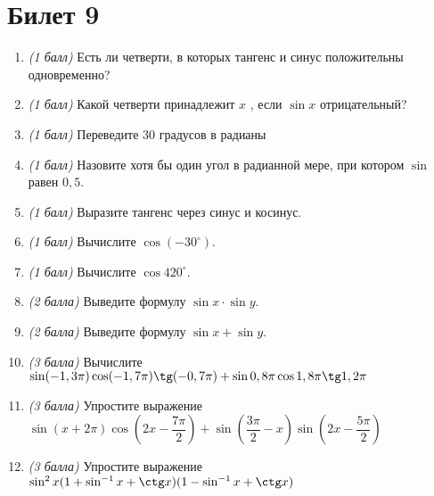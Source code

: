 \documentclass[12pt, a4paper]{article}
\begin{document}
	\section*{Билет 9}
	\begin{enumerate}
		\item \textit{(1 балл)}	Есть ли четверти, в которых тангенс и синус положительны одновременно? 
		\item \textit{(1 балл)}	Какой четверти принадлежит $x$ , если $\sin x$ отрицательный?
		\item \textit{(1 балл)}	Переведите 30 градусов в радианы
		\item \textit{(1 балл)}	Назовите хотя бы один угол в радианной мере, при котором $\sin$  равен $0,5$.
		\item \textit{(1 балл)}	Выразите тангенс через синус и косинус.
		\item \textit{(1 балл)} Вычислите $\cos (-30^{\circ})$.
		\item \textit{(1 балл)}	Вычислите $\cos 420^{\circ}$.
		\item \textit{(2 балла)} Выведите формулу $\sin x \cdot \sin y$.
		\item \textit{(2 балла)} Выведите формулу $\sin x + \sin y$.
		\item \textit{(3 балла)} Вычислите $\sin (-1,3\pi) \cos (-1,7 \pi) \tg (-0,7\pi)+ \sin 0,8\pi \cos 1,8 \pi \tg 1,2 \pi$
		\item \textit{(3 балла)} Упростите выражение $\sin (x+2\pi) \cos (2x-\dfrac{7\pi}{2})+ \sin (\dfrac{3\pi}{2}-x) \sin (2x - \dfrac{5\pi}{2})$
		\item \textit{(3 балла)} Упростите выражение $\sin^2 x(1+\sin^{-1}x + \ctg x)(1 - \sin^{-1}x + \ctg x)$
	\end{enumerate}
\end{document}
